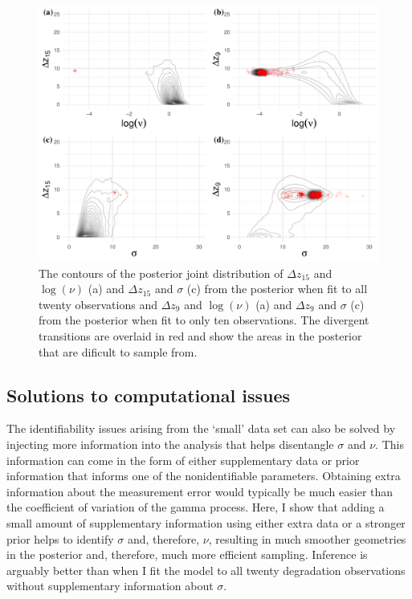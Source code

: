 \begin{figure}[tbp]
  \centering
  \includegraphics[width=0.95\columnwidth]{./figures/ch-4/joint-sig-jump.pdf}
  \caption{The contours of the posterior joint distribution of $\Delta z_{15}$ and $\log(\nu)$ (a) and $\Delta z_{15}$ and $\sigma$ (c) from the posterior when fit to all twenty observations and $\Delta z_{9}$ and $\log(\nu)$ (a) and $\Delta z_{9}$ and $\sigma$ (c) from the posterior when fit to only ten observations. The divergent transitions are overlaid in red and show the areas in the posterior that are dificult to sample from.}
  \label{fig:z-jump-comparison}
\end{figure}

\subsection{Solutions to computational issues} \label{sec:comp-sols}

The identifiability issues arising from the `small' data set can also be solved by injecting more information into the analysis that helps disentangle $\sigma$ and $\nu$. This information can come in the form of either supplementary data or prior information that informs one of the nonidentifiable parameters. Obtaining extra information about the measurement error would typically be much easier than the coefficient of variation of the gamma process. Here, I show that adding a small amount of supplementary information using either extra data or a stronger prior helps to identify $\sigma$ and, therefore, $\nu$, resulting in much smoother geometries in the posterior and, therefore, much more efficient sampling. Inference is arguably better than when I fit the model to all twenty degradation observations without supplementary information about $\sigma$.

